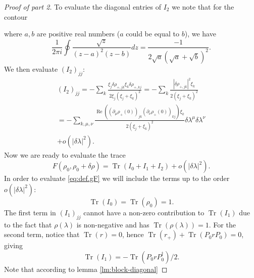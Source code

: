\documentclass[
  american,aps,pra,reprint,floatfix,nofootinbib,superscriptaddress
]{revtex4-2}
\DeclareMathOperator{\Tr}{Tr}
\DeclareMathOperator{\real}{Re}
\newcommand{\abs}[1]{\left|#1\right|}
\begin{document}
\begin{proof}[Proof of part 2]
  To evaluate the diagonal entries of $I_2$ we note that for the contour
  \begin{center}
  \end{center}
  where $a,b$ are positive real numbers ($a$ could be equal to $b$),
  we have
  \begin{equation}
    \frac1{2\pi i} \oint \frac{\sqrt{z}}{(z-a)^2(z-b)} dz = \frac{-1}{2\sqrt{a}(\sqrt{a} + \sqrt{b})^2}.
  \end{equation}
  We then evaluate $(I_2)_{jj}$:
  \begin{multline}
    \label{eq:I2jj}
    (I_2)_{jj} = -\sum_k \frac{\xi_j \delta \rho_{{+},jk}
      \xi_k \delta \rho_{{+},kj}}{2\xi_j (\xi_j + \xi_k)^2}
    = -\sum_k \frac{\abs{\delta \rho_{{+},jk}}^2 \xi_k}{2(\xi_j + \xi_k)^2} \\
    = -\sum_{k,\mu,\nu} \frac{
        \real\left(
          (\partial_\mu\rho_{+}(0))_{jk}(\partial_\nu\rho_{+}(0))_{kj}
        \right) \xi_k
      }{2(\xi_j + \xi_k)^2} \delta\lambda^\mu\delta\lambda^\nu \\
      + o(\abs{\delta \lambda}^2).
  \end{multline}
  Now we are ready to evaluate the trace
  \begin{equation}
    F(\rho_0, \rho_0 + \delta \rho) =
      \Tr(I_0 + I_1 + I_2) + o(\abs{\delta\lambda}^2).
  \end{equation}
  In order to evaluate \eqref{eq:def.gF} we will include the terms up to
  the order $o(\abs{\delta \lambda}^2)$:
  \begin{equation}
    \Tr(I_0) = \Tr(\rho_0) = 1.
  \end{equation}
  The first term in $(I_1)_{jj}$ cannot have a non-zero contribution to
  $\Tr(I_1)$ due to the fact that $\rho(\lambda)$ is non-negative and
  has $\Tr(\rho(\lambda)) = 1$. For the second term, notice that $\Tr(r) = 0$,
  hence $\Tr(r_{+}) + \Tr(P_0 r P_0) = 0$, giving
  \begin{equation}
    \label{eq:TrI1}
    \Tr(I_1) = - \Tr(P_0 r P_0^{\dagger}) / 2.
  \end{equation}
  Note that according to lemma \ref{lm:block-diagonal}

\end{proof}
\end{document}
